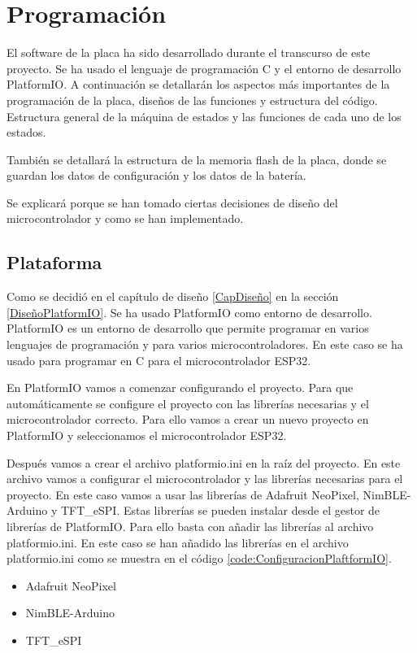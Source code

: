 \chapter{Programación}

El software de la placa ha sido desarrollado durante el transcurso de este proyecto. Se ha usado el lenguaje de programación C y el entorno de desarrollo PlatformIO. A continuación se detallarán los aspectos más importantes de la programación de la placa, diseños de las funciones y estructura del código. Estructura general de la máquina de estados y las funciones de cada uno de los estados.

También se detallará la estructura de la memoria flash de la placa, donde se guardan los datos de configuración y los datos de la batería.

Se explicará porque se han tomado ciertas decisiones de diseño del microcontrolador y como se han implementado.

\section{Plataforma}
Como se decidió en el capítulo de diseño \ref{CapDiseño} en la sección \ref{DiseñoPlatformIO}. Se ha usado PlatformIO como entorno de desarrollo. PlatformIO es un entorno de desarrollo que permite programar en varios lenguajes de programación y para varios microcontroladores. En este caso se ha usado para programar en C para el microcontrolador ESP32.

En PlatformIO vamos a comenzar configurando el proyecto. Para que automáticamente se configure el proyecto con las librerías necesarias y el microcontrolador correcto. Para ello vamos a crear un nuevo proyecto en PlatformIO y seleccionamos el microcontrolador ESP32.

Después vamos a crear el archivo platformio.ini en la raíz del proyecto. En este archivo vamos a configurar el microcontrolador y las librerías necesarias para el proyecto. En este caso vamos a usar las librerías de Adafruit NeoPixel, NimBLE-Arduino y TFT\_eSPI. Estas librerías se pueden instalar desde el gestor de librerías de PlatformIO. Para ello basta con añadir las librerías al archivo platformio.ini. En este caso se han añadido las librerías en el archivo platformio.ini como se muestra en el código \ref{code:ConfiguracionPlaftformIO}.

\begin{itemize}
\item Adafruit NeoPixel
\item NimBLE-Arduino
\item TFT\_eSPI
\end{itemize}
\label{LibreriasPlatformIO}

